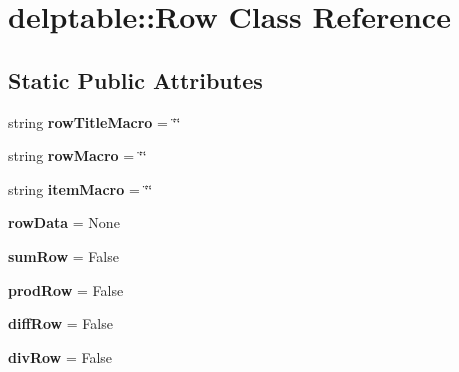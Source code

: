 \hypertarget{classdelptable_1_1Row}{
\section{delptable::Row Class Reference}
\label{classdelptable_1_1Row}
}
\subsection*{Static Public Attributes}
\begin{DoxyCompactItemize}
\item 
\hypertarget{classdelptable_1_1Row_a08bce34f2b910054dadf60094aed751d}{
string {\bfseries rowTitleMacro} = \char`\"{}\char`\"{}}
\label{classdelptable_1_1Row_a08bce34f2b910054dadf60094aed751d}

\item 
\hypertarget{classdelptable_1_1Row_a48c92654da58aef43fbe52bd34c4c84c}{
string {\bfseries rowMacro} = \char`\"{}\char`\"{}}
\label{classdelptable_1_1Row_a48c92654da58aef43fbe52bd34c4c84c}

\item 
\hypertarget{classdelptable_1_1Row_af3dfca7b6de1b20f1fa5d9a87aa4f0e7}{
string {\bfseries itemMacro} = \char`\"{}\char`\"{}}
\label{classdelptable_1_1Row_af3dfca7b6de1b20f1fa5d9a87aa4f0e7}

\item 
\hypertarget{classdelptable_1_1Row_a7403d1d148d535b251cd32cfbbe6f300}{
{\bfseries rowData} = None}
\label{classdelptable_1_1Row_a7403d1d148d535b251cd32cfbbe6f300}

\item 
\hypertarget{classdelptable_1_1Row_aae144fb5717c1f174487c3a5e0c95862}{
{\bfseries sumRow} = False}
\label{classdelptable_1_1Row_aae144fb5717c1f174487c3a5e0c95862}

\item 
\hypertarget{classdelptable_1_1Row_a81185958d383a807d78081353e056850}{
{\bfseries prodRow} = False}
\label{classdelptable_1_1Row_a81185958d383a807d78081353e056850}

\item 
\hypertarget{classdelptable_1_1Row_a533b4ecaf25af744d791371190d887f0}{
{\bfseries diffRow} = False}
\label{classdelptable_1_1Row_a533b4ecaf25af744d791371190d887f0}

\item 
\hypertarget{classdelptable_1_1Row_ae1541dd391bf6a7c45fb31b3c6703b11}{
{\bfseries divRow} = False}
\label{classdelptable_1_1Row_ae1541dd391bf6a7c45fb31b3c6703b11}


\end{DoxyCompactItemize}
